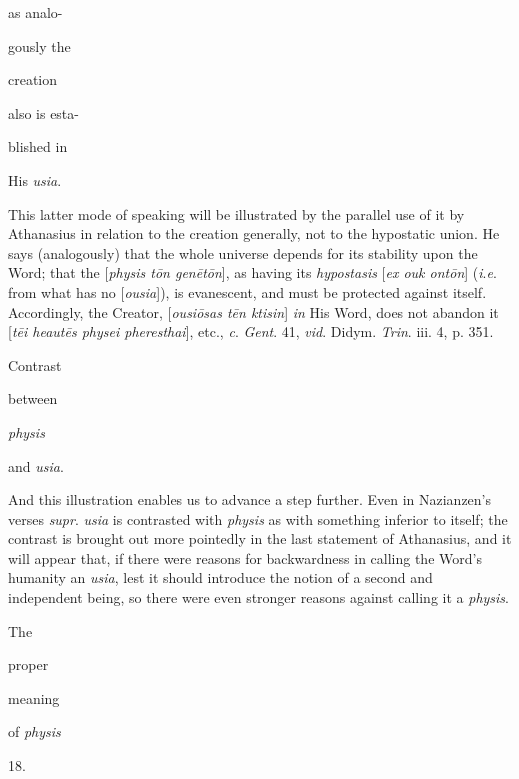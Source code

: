 as analo-

gously the

creation

also is esta-

blished in

His \emph{usia}.

This latter mode of
speaking will be illustrated by the parallel use of it by
Athanasius in relation to the creation generally, not to the
hypostatic union. He says (analogously) that the whole
universe depends for its stability upon the Word; that the [\emph{physis
t\={o}n gen\={e}t\={o}n}], as having its \emph{hypostasis}
[\emph{ex ouk ont\={o}n}] (\emph{i}.\emph{e}. from what has
no [\emph{ousia}]), is evanescent, and must be protected
against itself. Accordingly, the Creator, [\emph{ousi\={o}sas
t\={e}n ktisin}] \emph{in} His Word, does not abandon it
[\emph{t\={e}i heaut\={e}s physei pheresthai}], etc., \emph{c}.
\emph{Gent}. 41, \emph{vid}. Didym. \emph{Trin}. iii. 4, p.
351.

Contrast

between

\emph{physis}

and \emph{usia}.

And this illustration
enables us to advance a step further. Even in Nazianzen's
verses \emph{supr}. \emph{usia} is contrasted with \emph{physis}
as with something inferior to itself; the contrast is brought
out more pointedly in the last statement of Athanasius, and it
will appear that, if there were reasons for backwardness in
calling the Word's humanity an \emph{usia}, lest it should
introduce the notion of a second and independent being, so
there were even stronger reasons against calling it a \emph{physis}.

The

proper

meaning

of \emph{physis}

18.

